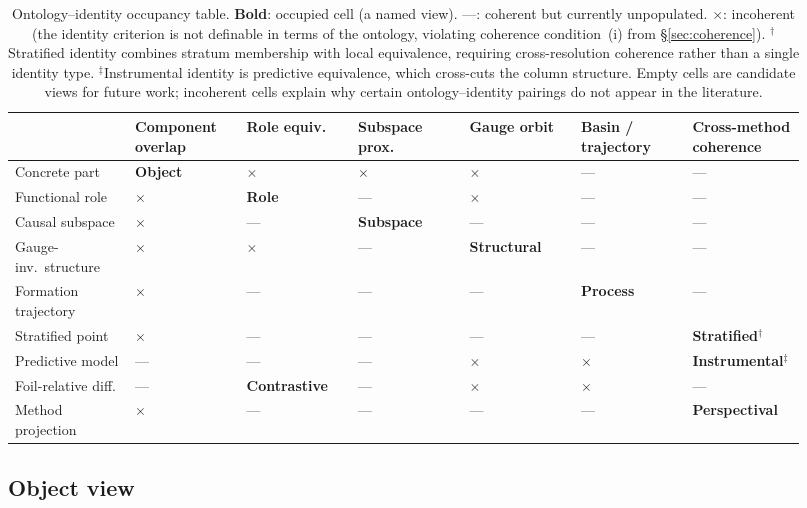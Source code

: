\documentclass{article}
\begin{document}
\begin{table}[H]
\centering
\small
\setlength{\tabcolsep}{3pt}
\begin{tabular}{p{0.14\linewidth}p{0.13\linewidth}p{0.13\linewidth}p{0.13\linewidth}p{0.13\linewidth}p{0.13\linewidth}p{0.13\linewidth}}
\toprule
& \textbf{Component overlap} & \textbf{Role equiv.} & \textbf{Subspace prox.} & \textbf{Gauge orbit} & \textbf{Basin / trajectory} & \textbf{Cross-method coherence} \\
\midrule
Concrete part
  & \textbf{Object} & $\times$ & $\times$ & $\times$ & --- & --- \\[2pt]
Functional role
  & $\times$ & \textbf{Role} & --- & $\times$ & --- & --- \\[2pt]
Causal subspace
  & $\times$ & --- & \textbf{Subspace} & --- & --- & --- \\[2pt]
Gauge-inv.\ structure
  & $\times$ & $\times$ & --- & \textbf{Structural} & --- & --- \\[2pt]
Formation trajectory
  & $\times$ & --- & --- & --- & \textbf{Process} & --- \\[2pt]
Stratified point
  & $\times$ & --- & --- & --- & --- & \textbf{Stratified}$^\dagger$ \\[2pt]
Predictive model
  & --- & --- & --- & $\times$ & $\times$ & \textbf{Instrumental}$^\ddagger$ \\[2pt]
Foil-relative diff.
  & --- & \textbf{Contrastive} & --- & $\times$ & $\times$ & --- \\[2pt]
Method projection
  & $\times$ & --- & --- & --- & --- & \textbf{Perspectival} \\
\bottomrule
\end{tabular}
\caption{Ontology--identity occupancy table.  \textbf{Bold}: occupied cell (a named view).  ---: coherent but currently unpopulated.  $\times$: incoherent (the identity criterion is not definable in terms of the ontology, violating coherence condition~(i) from \S\ref{sec:coherence}).  $^\dagger$Stratified identity combines stratum membership with local equivalence, requiring cross-resolution coherence rather than a single identity type.  $^\ddagger$Instrumental identity is predictive equivalence, which cross-cuts the column structure.  Empty cells are candidate views for future work; incoherent cells explain why certain ontology--identity pairings do not appear in the literature.}
\label{tab:occupancy}
\end{table}


\subsection{Object view}
\end{document}
